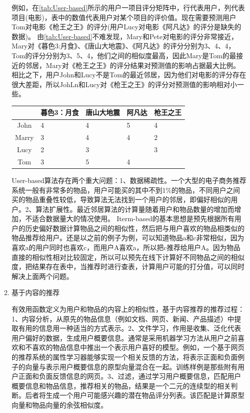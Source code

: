\begin{enumerate}[(1)]
	例如，在\autoref{tab:User-based}所示的用户一项目评分矩阵中，行代表用户，列代表项目(电影)，表中的数值代表用户对某个项目的评价值。现在需要预测用户Tom对电影《枪王之王》的评分(用户Lucy对电影《阿凡达》的评分是缺失的数据)。
	由\autoref{tab:User-based}不难发现，Mary和Pete对电影的评分非常接近，Mary对《暮色3:月食》、《唐山大地震》、《阿凡达》的评分分别为3、4、4，Tom的评分分别为3、5、4，他们之间的相似度最高，因此Mary是Tom的最接近的邻居，Mary对《枪王之王》的评分结果对预测值的影响占据最大比例。相比之下，用户John和Lucy不是Tom的最近邻居，因为他们对电影的评分存在很大差距，所以JohLn和Lucy对《枪王之王》的评分对预测值的影响相对小一些。
	\begin{table}[htp]
	\centering
	\label{tab:User-based}
	\begin{tabular}{ |c|p{2cm}|p{2cm}|p{2cm}|p{2cm}| } \hline
	 & 暮色3：月食 & 唐山大地震 & 阿凡达 & 枪王之王 \\ \hline
	John & 4 & 4 & 5 & 4 \\ \hline
	Marry & 3 & 4 & 4 & 2 \\ \hline
	Lucy & 2 & 3 &  & 3 \\ \hline
	Tom & 3 & 5 & 4 &  \\ \hline
	\end{tabular}
	\end{table}

	User-based算法存在两个重大问题：1、数据稀疏性。一个大型的电子商务推荐系统一般有非常多的物品，用户可能买的其中不到1\%的物品，不同用户之间买的物品重叠性较低，导致算法无法找到一个用户的邻居，即偏好相似的用户。2、算法扩展性。最近邻居算法的计算量随着用户和物品数量的增加而增加，不适合数据量大的情况使用。 Iterm-based的基本思想是预先根据所有用户的历史偏好数据计算物品之间的相似性，然后把与用户喜欢的物品相类似的物品推荐给用户。还是以之前的例子为例，可以知道物品a和c非常相似，因为喜欢a的用户同时也喜欢c，而用户A喜欢a，所以把c推荐给用户A。因为物品直接的相似性相对比较固定，所以可以预先在线下计算好不同物品之间的相似度，把结果存在表中，当推荐时进行查表，计算用户可能的打分值，可以同时解决上面两个问题。
	\item 基于内容的推荐

	有效用函数定义为用户和物品的内容上的相似性，基于内容推荐的推荐过程：1、内容分析，从原先的物品信息（例如文档、网页、新闻、产品描述）中提取有用的信息用一种适当的方式表示。2、文件学习，作用是收集、泛化代表用户偏好的数据，生成用户概要信息。通常是采用机器学习方法从用户之前喜欢和不喜欢的物品信息中推出一个表示用户喜好的模型。例如，一个基于网页的推荐系统的属性学习器能够实现一个相关反馈的方法，将表示正面和负面例子的向量与表示用户概要信息的原型向量混合在一起。训练样例是那些附有用户正面和负面反馈信息的网页。3、过滤，通过学习用户概要信息，匹配用户概要信息和物品信息，推荐相关的物品，结果是一个二元的连续型的相关判断。后者将生成一个用户可能感兴趣的潜在物品评分列表。该匹配是计算原型向量和物品向量的余弦相似度。


\end{enumerate}
